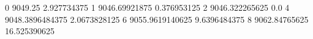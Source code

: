 0 9049.25 2.927734375
1 9046.69921875 0.376953125
2 9046.322265625 0.0
4 9048.3896484375 2.0673828125
6 9055.9619140625 9.6396484375
8 9062.84765625 16.525390625
